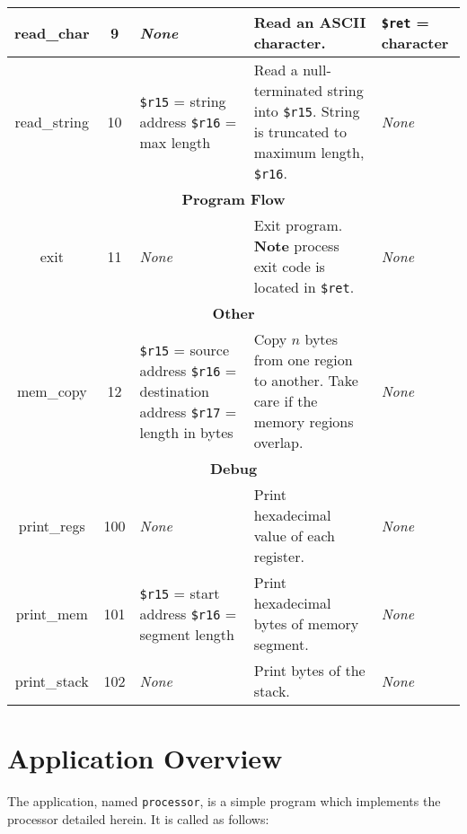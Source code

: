 \documentclass[10pt]{article}
\begin{document}
\begin{longtable}{|c|c|l|l|l|}
        \hline
        read\_char & 9 & \textit{None} & Read an ASCII character. & \texttt{\$ret} = character \\
        \hline
        read\_string & 10 & \makecell[l]{\texttt{\$r15} = string address\\%
        \texttt{\$r16} = max length} & \makecell[l]{Read a null-terminated string into \texttt{\$r15}.\\%
        String is truncated to maximum length, \texttt{\$r16}.} & \textit{None} \\
        \hline \hline
        \multicolumn{5}{|c|}{\textbf{Program Flow}} \\
        \hline
        exit & 11 & \textit{None} & \makecell[l]{Exit program.\\%
        \textbf{Note} process exit code is located in \texttt{\$ret}.} & \textit{None} \\
        \hline \hline
        \multicolumn{5}{|c|}{\textbf{Other}} \\
        \hline
        mem\_copy & 12 & \makecell[l]{\texttt{\$r15} = source address\\%
        \texttt{\$r16} = destination address\\%
        \texttt{\$r17} = length in bytes} & \makecell[l]{Copy \(n\) bytes from one region to another.\\%
        Take care if the memory regions overlap.} & \textit{None} \\
        \hline \hline
        \multicolumn{5}{|c|}{\textbf{Debug}} \\
        \hline
        print\_regs & 100 & \textit{None} & Print hexadecimal value of each register. & \textit{None} \\
        \hline
        print\_mem & 101 & \makecell[l]{\texttt{\$r15} = start address\\%
        \texttt{\$r16} = segment length} & Print hexadecimal bytes of memory segment. & \textit{None} \\
        \hline
        print\_stack & 102 & \textit{None} & Print bytes of the stack. & \textit{None} \\
        \hline
    \end{longtable}

    \section{Application Overview}

    The application, named \texttt{processor}, is a simple program which implements the processor detailed herein.
    It is called as follows:
\end{document}
